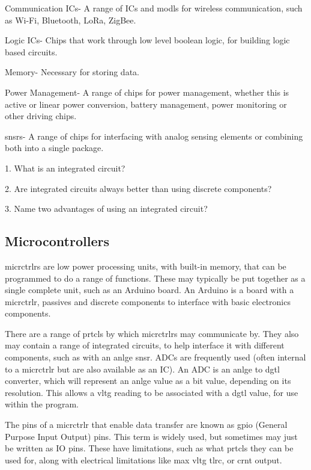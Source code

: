 \documentclass[a4paper,11pt]{report}
\newcommand{\Quiz}[1] %
{
\par\noindent %
\phantomsection %
\todo[inline, color=blue!30]{\textbf{#1}} %
\vspace{1em} %
}
\begin{document}
Communication ICs- A range of ICs and \gls{modl}s for wireless communication, such as Wi-Fi, Bluetooth, LoRa, ZigBee.

Logic ICs- Chips that work through low level boolean logic, for building logic based circuits.

Memory- Necessary for storing data.

Power Management- A range of chips for power management, whether this is active or linear power conversion, battery management, power monitoring or other driving chips.

\gls{snsr}s- A range of chips for interfacing with analog sensing elements or combining both into a single package.

\Quiz{Quiz}

1. What is an integrated circuit?

2. Are integrated circuits always better than using discrete components?

3. Name two advantages of using an integrated circuit?

\vspace*{1\baselineskip}

\subsection{Microcontrollers}

\gls{micrctrlr}s are low power processing units, with built-in memory, that can be programmed to do a range of functions. These may typically be put together as a single complete unit, such as an Arduino board. An Arduino is a board with a \gls{micrctrlr}, passives and discrete components to interface with basic electronics components.

There are a range of \gls{prtcl}s by which \gls{micrctrlr}s may communicate by. They also may contain a range of integrated circuits, to help interface it with different components, such as with an \gls{anlge} \gls{snsr}. ADCs are frequently used (often internal to a \gls{micrctrlr} but are also available as an IC). An ADC is an \gls{anlge} to \gls{dgtl} converter, which will represent an \gls{anlge} value as a bit value, depending on its resolution. This allows a \gls{vltg} reading to be associated with a \gls{dgtl} value, for use within the program.

The pins of a \gls{micrctrlr} that enable data transfer are known as \gls{gpio} (General Purpose Input Output) pins. This term is widely used, but sometimes may just be written as IO pins. These have limitations, such as what \gls{prtcl}s they can be used for, along with electrical limitations like max \gls{vltg} \gls{tlrc}, or \gls{crnt} output.
\end{document}
